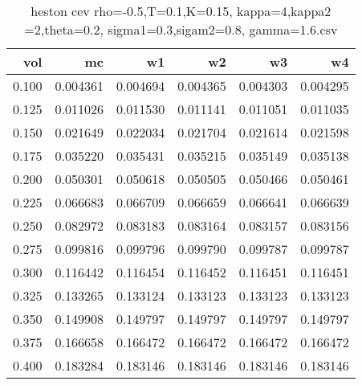 \begin{table}
  \centering
  \caption{heston cev rho=-0.5,T=0.1,K=0.15, kappa=4,kappa2 =2,theta=0.2, sigma1=0.3,sigam2=0.8, gamma=1.6.csv}
  \begin{tabular}{rrrrrr}
  \toprule
    vol &       mc &       w1 &       w2 &       w3 &       w4 \\
  \midrule
  0.100 & 0.004361 & 0.004694 & 0.004365 & 0.004303 & 0.004295 \\
  0.125 & 0.011026 & 0.011530 & 0.011141 & 0.011051 & 0.011035 \\
  0.150 & 0.021649 & 0.022034 & 0.021704 & 0.021614 & 0.021598 \\
  0.175 & 0.035220 & 0.035431 & 0.035215 & 0.035149 & 0.035138 \\
  0.200 & 0.050301 & 0.050618 & 0.050505 & 0.050466 & 0.050461 \\
  0.225 & 0.066683 & 0.066709 & 0.066659 & 0.066641 & 0.066639 \\
  0.250 & 0.082972 & 0.083183 & 0.083164 & 0.083157 & 0.083156 \\
  0.275 & 0.099816 & 0.099796 & 0.099790 & 0.099787 & 0.099787 \\
  0.300 & 0.116442 & 0.116454 & 0.116452 & 0.116451 & 0.116451 \\
  0.325 & 0.133265 & 0.133124 & 0.133123 & 0.133123 & 0.133123 \\
  0.350 & 0.149908 & 0.149797 & 0.149797 & 0.149797 & 0.149797 \\
  0.375 & 0.166658 & 0.166472 & 0.166472 & 0.166472 & 0.166472 \\
  0.400 & 0.183284 & 0.183146 & 0.183146 & 0.183146 & 0.183146 \\
  \bottomrule
  \end{tabular}
  \end{table}        